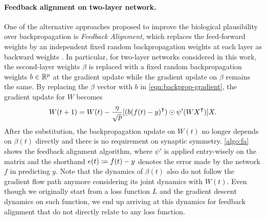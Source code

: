 \paragraph{Feedback alignment on two-layer network.}

One of the alternative approaches proposed to improve the biological plausibility over backpropagation is \emph{Feedback Alignment}, which replaces the feed-forward weights by an independent fixed random backpropagation weights at each layer as backward weights \citep{lillicrap2016random}. In particular, for two-layer networks considered in this work, the second-layer weights $\beta$ is replaced with a fixed random backpropagation weights $b\in{\mathbb{R}^{p}}$ at the gradient update while the gradient update on $\beta$ remains the same. By replacing the $\beta$ vector with $b$ in \cref{eqn:backprop-gradient}, the gradient update for $W$ becomes
\begin{align}\label{eqn:alignment-update}
    W(t+1) = W(t) - \frac{\eta}{\sqrt{p}} [(b (f(t) - y)\transpose)\odot \psi'(WX\transpose)] X.
\end{align}
After the substitution, the backpropagation update on $W(t)$ no longer depends on $\beta(t)$ directly and there is no requirement on synaptic symmetry. \cref{algo:fa} shows the feedback alignment algorithm, where $\psi'$ is applied entry-wisely on the matrix and the shorthand $e(t) \coloneqq f(t) -y$ denotes the error made by the network $f$ in predicting $y$.  Note that the dynamics of $\beta(t)$ also do not follow the gradient flow path anymore considering its joint dynamics with $W(t)$. Even though we originally start from a loss function $L$ and the gradient descent dynamics on such function, we end up arriving at this dynamics for feedback alignment that do not directly relate to any loss function.

